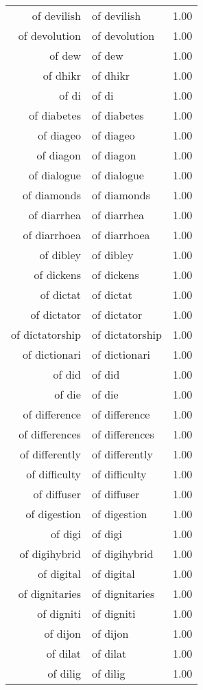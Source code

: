 \begin{table}[ht]
\begin{tabular}{rlr}
  of devilish & of devilish & 1.00 \\ 
  of devolution & of devolution & 1.00 \\ 
  of dew & of dew & 1.00 \\ 
  of dhikr & of dhikr & 1.00 \\ 
  of di & of di & 1.00 \\ 
  of diabetes & of diabetes & 1.00 \\ 
  of diageo & of diageo & 1.00 \\ 
  of diagon & of diagon & 1.00 \\ 
  of dialogue & of dialogue & 1.00 \\ 
  of diamonds & of diamonds & 1.00 \\ 
  of diarrhea & of diarrhea & 1.00 \\ 
  of diarrhoea & of diarrhoea & 1.00 \\ 
  of dibley & of dibley & 1.00 \\ 
  of dickens & of dickens & 1.00 \\ 
  of dictat & of dictat & 1.00 \\ 
  of dictator & of dictator & 1.00 \\ 
  of dictatorship & of dictatorship & 1.00 \\ 
  of dictionari & of dictionari & 1.00 \\ 
  of did & of did & 1.00 \\ 
  of die & of die & 1.00 \\ 
  of difference & of difference & 1.00 \\ 
  of differences & of differences & 1.00 \\ 
  of differently & of differently & 1.00 \\ 
  of difficulty & of difficulty & 1.00 \\ 
  of diffuser & of diffuser & 1.00 \\ 
  of digestion & of digestion & 1.00 \\ 
  of digi & of digi & 1.00 \\ 
  of digihybrid & of digihybrid & 1.00 \\ 
  of digital & of digital & 1.00 \\ 
  of dignitaries & of dignitaries & 1.00 \\ 
  of digniti & of digniti & 1.00 \\ 
  of dijon & of dijon & 1.00 \\ 
  of dilat & of dilat & 1.00 \\ 
  of dilig & of dilig & 1.00 \\ 

\end{tabular}
\end{table}
